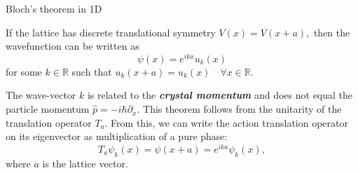 \documentclass{article}
\theoremstyle{nonumberplain}
\begin{document}
\begin{frm-thm}{Bloch's theorem in 1D}

    If the lattice has discrete translational symmetry $V(x) = V(x+a),$  then the wavefunction can be written as 
    \[
        \psi(x) = e^{i k x} u_k(x)
    \]
    for some $k \in \mathbb{R} $ such that $u_k(x+a) = u_k(x) \quad \forall x \in \mathbb{R}.$
\end{frm-thm}
The wave-vector $k$ is related to the \textit{\textbf{crystal momentum}} and does not equal the particle momentum $\hat{p} = -i \hbar \partial_x .$ This theorem follows from the unitarity of the translation operator $T_a. $ From this, we can write the action translation operator on its eigenvector as multiplication of a pure phase:
\[
    T_a \psi_k(x) = \psi(x+a) = e^{i k a} \psi_k(x),
\]
where $a$ is the lattice vector. 
\end{document}
